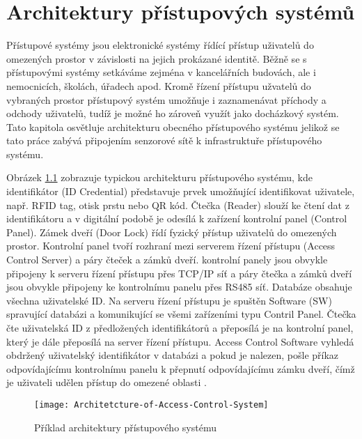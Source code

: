 \chapter{Architektury přístupových systémů}
Přístupové systémy jsou elektronické systémy řídící přístup uživatelů do omezených prostor v závislosti na jejich prokázané identitě. 
Běžně se s přístupovými systémy setkáváme zejména v kancelářních budovách, ale i nemocnicích, školách, úřadech apod.
Kromě řízení přístupu užvatelů do vybraných prostor přístupový systém umožňuje i zaznamenávat příchody a odchody uživatelů, tudíž je možné ho zároveň využít jako docházkový systém.
Tato kapitola osvětluje architekturu obecného přístupového systému jelikož se tato práce zabývá připojením senzorové sítě k infrastruktuře přístupového systému. 


Obrázek \ref{fig:Access control system architecture} zobrazuje typickou architekturu přístupového systému, kde identifikátor (ID Credential) představuje prvek umožňující identifikovat uživatele, např. RFID tag, otisk prstu nebo QR kód. 
Čtečka (Reader) slouží ke čtení dat z identifikátoru a v digitální podobě je odesílá k zařízení kontrolní panel (Control Panel).
Zámek dveří (Door Lock) řídí fyzický přístup uživatelů do omezených prostor. 
Kontrolní panel tvoří rozhraní mezi serverem řízení přístupu (Access Control Server) a páry čteček a zámků dveří.
kontrolní panely jsou obvykle připojeny k serveru řízení přístupu přes TCP/IP síť a páry čtečka a zámků dveří jsou obvykle připojeny ke kontrolnímu panelu přes RS485 síť. Databáze obsahuje všechna uživatelské ID.
Na serveru řízení přístupu je spuštěn Software (SW) spravující databázi a komunikující se všemi zařízeními typu Contril Panel.
Čtečka čte uživatelská ID z předložených identifikátorů a přeposílá je na kontrolní panel, který je dále přeposílá na server řízení přístupu. 
Access Control Software vyhledá obdržený uživatelský identifikátor v databázi a pokud je nalezen, pošle příkaz odpovídajícímu kontrolnímu panelu k přepnutí odpovídajícímu zámku dveří, čímž je uživateli udělen přístup do omezené oblasti \cite{accessControlSystem_eiprocus}.


\begin{figure}[!h]
    \centering
    \texttt{[image: Architetcture-of-Access-Control-System]}
    \caption{Příklad architektury přístupového systému \cite{accessControlSystem_eiprocus}}
    \label{fig:Access control system architecture}
\end{figure}

